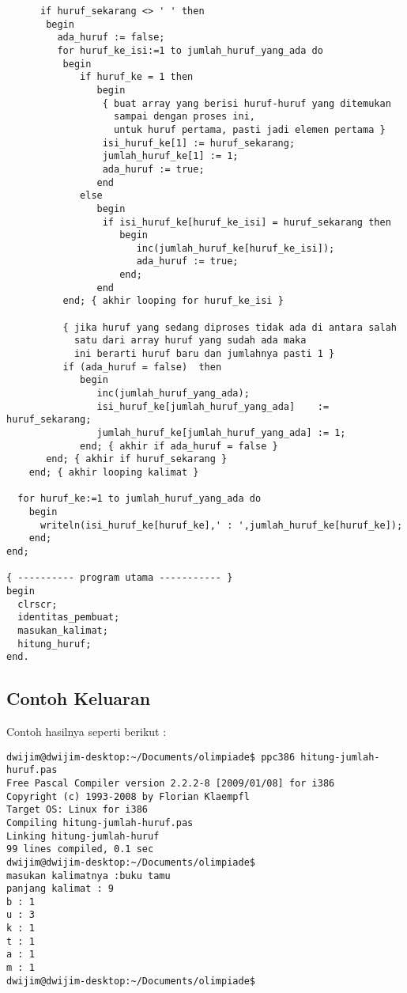 \documentclass[a4paper,10pt,makeidx]{article}
\begin{document}
\begin{verbatim}
      if huruf_sekarang <> ' ' then
       begin
         ada_huruf := false;
         for huruf_ke_isi:=1 to jumlah_huruf_yang_ada do
          begin
             if huruf_ke = 1 then 
                begin
                 { buat array yang berisi huruf-huruf yang ditemukan
                   sampai dengan proses ini,
                   untuk huruf pertama, pasti jadi elemen pertama }
                 isi_huruf_ke[1] := huruf_sekarang;
                 jumlah_huruf_ke[1] := 1;
                 ada_huruf := true; 
                end
             else
                begin
                 if isi_huruf_ke[huruf_ke_isi] = huruf_sekarang then
                    begin
                       inc(jumlah_huruf_ke[huruf_ke_isi]);
                       ada_huruf := true;
                    end;
                end
          end; { akhir looping for huruf_ke_isi }
            
          { jika huruf yang sedang diproses tidak ada di antara salah
            satu dari array huruf yang sudah ada maka
            ini berarti huruf baru dan jumlahnya pasti 1 }
          if (ada_huruf = false)  then
             begin
                inc(jumlah_huruf_yang_ada);
                isi_huruf_ke[jumlah_huruf_yang_ada]    := huruf_sekarang;
                jumlah_huruf_ke[jumlah_huruf_yang_ada] := 1;
             end; { akhir if ada_huruf = false }
       end; { akhir if huruf_sekarang }
    end; { akhir looping kalimat }

  for huruf_ke:=1 to jumlah_huruf_yang_ada do
    begin
      writeln(isi_huruf_ke[huruf_ke],' : ',jumlah_huruf_ke[huruf_ke]);
    end;
end;

{ ---------- program utama ----------- }
begin
  clrscr;
  identitas_pembuat;
  masukan_kalimat;
  hitung_huruf;
end.
\end{verbatim}
\subsection{Contoh Keluaran}
\par
\indent
\indent
Contoh hasilnya seperti berikut :
\begin{verbatim}
dwijim@dwijim-desktop:~/Documents/olimpiade$ ppc386 hitung-jumlah-huruf.pas 
Free Pascal Compiler version 2.2.2-8 [2009/01/08] for i386
Copyright (c) 1993-2008 by Florian Klaempfl
Target OS: Linux for i386
Compiling hitung-jumlah-huruf.pas
Linking hitung-jumlah-huruf
99 lines compiled, 0.1 sec 
dwijim@dwijim-desktop:~/Documents/olimpiade$ 
masukan kalimatnya :buku tamu
panjang kalimat : 9
b : 1
u : 3
k : 1
t : 1
a : 1
m : 1
dwijim@dwijim-desktop:~/Documents/olimpiade$ 
\end{verbatim}
\end{document}
